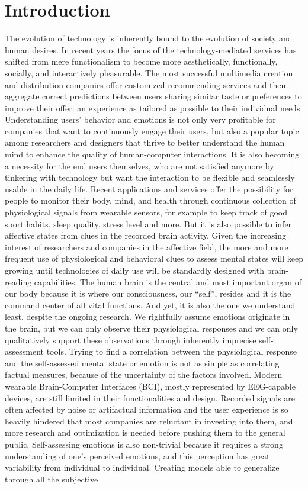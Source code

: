 \chapter{Introduction}
\label{chap:introduction}

The evolution of technology is inherently bound to the evolution of society and human desires. In recent years the focus of the technology-mediated services has shifted from mere functionalism to become more aesthetically, functionally, socially, and interactively pleasurable. The most successful multimedia creation and distribution companies offer customized recommending services and then aggregate correct predictions between users sharing similar taste or preferences to improve their offer: an experience as tailored as possible to their individual needs. Understanding users’ behavior and emotions is not only very profitable for companies that want to continuously engage their users, but also a popular topic among researchers and designers that thrive to better understand the human mind to enhance the quality of human-computer interactions. It is also becoming a necessity for the end users themselves, who are not satisfied anymore by tinkering with technology but want the interaction to be flexible and seamlessly usable in the daily life. Recent applications and services offer the possibility for people to monitor their body, mind, and health through continuous collection of physiological signals from wearable sensors, for example to keep track of good sport habits, sleep quality, stress level and more. But it is also possible to infer affective states from clues in the recorded brain activity. Given the increasing interest of researchers and companies in the affective field, the more and more frequent use of physiological and behavioral clues to assess mental states will keep growing until technologies of daily use will be standardly designed with brain-reading capabilities. The human brain is the central and most important organ of our body because it is where our consciousness, our “self”, resides and it is the command center of all vital functions. And yet, it is also the one we understand least, despite the ongoing research. We rightfully assume emotions originate in the brain, but we can only observe their physiological responses and we can only qualitatively support these observations through inherently imprecise self-assessment tools. Trying to find a correlation between the physiological response and the self-assessed mental state or emotion is not as simple as correlating factual measures, because of the uncertainty of the factors involved. Modern wearable Brain-Computer Interfaces (BCI), mostly represented by EEG-capable devices, are still limited in their functionalities and design. Recorded signals are often affected by noise or artifactual information and the user experience is so heavily hindered that most companies are reluctant in investing into them, and more research and optimization is needed before pushing them to the general public. Self-assessing emotions is also non-trivial because it requires a strong understanding of one’s perceived emotions, and this perception has great variability from individual to individual. Creating models able to generalize through all the subjective 